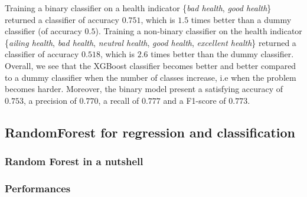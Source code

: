 \documentclass[]{article}
\begin{document}
\noindent
Training a binary classifier on a health indicator \{\textit{bad health}, \textit{good health}\}
returned a classifier of accuracy $0.751$, which is $1.5$ times better than a dummy classifier (of accuracy $0.5$). Training a non-binary classifier on the health indicator \{\textit{ailing health}, \textit{bad health}, \textit{neutral health}, \textit{good health}, \textit{excellent health}\} returned a classifier of accuracy $0.518$, which is $2.6$ times better than the dummy classifier.\\
Overall, we see that the XGBoost classifier becomes better and better compared to a dummy classifier when the number of classes increase, i.e when the problem becomes harder. Moreover, the binary model present a satisfying accuracy of $0.753$, a precision of $0.770$, a recall of $0.777$ and a F1-score of $0.773$.

\subsection{RandomForest for regression and classification}
\subsubsection{Random Forest in a nutshell}
\subsubsection{Performances}

\cleardoublepage
\appendix
\end{document}
